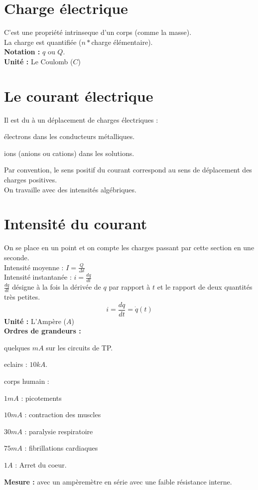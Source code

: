 \documentclass[12pt,twoside,a4paper]{article}
\author{MPSI 2}
\begin{document}
	\maketitle
	\section{Charge \'electrique}
		C'est une propri\'et\'e intrinseque d'un corps (comme la masse). \\
		La charge est quantifi\'ee ($n*$charge \'el\'ementaire). \\
		\textbf{Notation :} $q$ ou $Q$. \\
		\textbf{Unit\'e :} Le Coulomb ($C$)
	\section{Le courant \'electrique}
		Il est du \`a un d\'eplacement de charges \'electriques :
		\begin{liste}
			\item \'electrons dans les conducteurs m\'etalliques.
			\item ions (anions ou cations) dans les solutions.
		\end{liste}
		Par convention, le sens positif du courant correspond au sens de d\'eplacement des charges positives. \\
		On travaille avec des intensit\'es alg\'ebriques.
	\section{Intensit\'e du courant}
		On se place en un point et on compte les charges passant par cette section en une seconde. \\
		Intensit\'e moyenne : $I=\frac{Q}{\Delta t}$ \\
		Intensit\'e instantan\'ee : $i=\frac{dq}{dt}$ \\
		$\frac{dq}{dt}$ d\'esigne \`a la fois la d\'eriv\'ee de $q$ par rapport \`a $t$ et le rapport de deux quantit\'es tr\`es petites.
		$$i=\frac{dq}{dt}=\dot{q}(t)$$
		\textbf{Unit\'e :} L'Amp\`ere ($A$) \\
		\textbf{Ordres de grandeurs :}
		\begin{liste}
			\item quelques $mA$ sur les circuits de TP.
			\item eclairs : $10kA$.
			\item corps humain :
				\begin{liste}
					\item $1mA$ : picotements
					\item $10mA$ : contraction des muscles
					\item $30mA$ : paralysie respiratoire
					\item $75mA$ : fibrillations cardiaques
					\item $1A$ : Arret du coeur.
				\end{liste}
		\end{liste}
		\textbf{Mesure :} avec un amp\`erem\`etre en s\'erie avec une faible r\'esistance interne.
\end{document}
